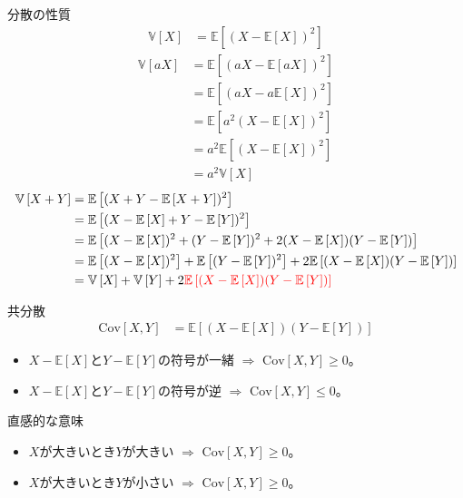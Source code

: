 \documentclass[lualatex,handout]{beamer}
\newcommand{\mycolor}[2]{%
  \begingroup
  \colorlet{currentcolor}{.}%
  \color{#1}#2%
  \color{currentcolor}%
  \endgroup
}
\newcommand{\emm}[1]{\mycolor{red}{#1}}
\newcommand{\expt}[1]{\mathbb{E}\left[#1\right]}
\newcommand{\var}[1]{\mathbb{V}\left[#1\right]}
\newcommand{\cov}[1]{\mathrm{Cov}\left[#1\right]}
\theoremstyle{definition}
\begin{document}
\begin{frame}{分散の性質}
\small
\begin{align*}
\var{X} &= \expt{(X-\expt{X})^2}
\end{align*}
\begin{align*}
\var{aX} &= \expt{(aX-\expt{aX})^2}\\
&= \expt{(aX-a\expt{X})^2}\\
&= \expt{a^2(X-\expt{X})^2}\\
&= a^2\expt{(X-\expt{X})^2}\\
&= a^2\var{X}
\end{align*}
%
\begin{align*}
\var{X+Y} &= \expt{(X+Y-\expt{X+Y})^2}\\
 &= \expt{(X-\expt{X}+Y-\expt{Y})^2}\\
 &= \expt{(X-\expt{X})^2+(Y-\expt{Y})^2 + 2(X-\expt{X})(Y-\expt{Y})}\\
 &= \expt{(X-\expt{X})^2}+\expt{(Y-\expt{Y})^2} + 2\expt{(X-\expt{X})(Y-\expt{Y})}\\
 &= \var{X}+\var{Y}+ 2\emm{\expt{(X-\expt{X})(Y-\expt{Y})}}\\
\end{align*}
\end{frame}

\begin{frame}{共分散}
\begin{align*}
\cov{X,Y} &= \expt{(X-\expt{X})(Y-\expt{Y})}
\end{align*}

\vspace{1em}

\begin{itemize}
\setlength{\itemsep}{2em}
\item $X-\expt{X}$と$Y-\expt{Y}$の符号が一緒 $\Rightarrow$ $\cov{X,Y}\ge 0$。
\item $X-\expt{X}$と$Y-\expt{Y}$の符号が逆 $\Rightarrow$ $\cov{X,Y}\le 0$。
\end{itemize}

\vspace{1em}
直感的な意味

\vspace{1em}
\begin{itemize}
\setlength{\itemsep}{2em}
\item $X$が大きいとき$Y$が大きい $\Rightarrow$ $\cov{X,Y}\ge 0$。
\item $X$が大きいとき$Y$が小さい $\Rightarrow$ $\cov{X,Y}\ge 0$。
\end{itemize}
\end{frame}
\end{document}
